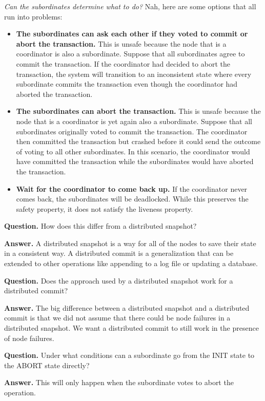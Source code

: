 \documentclass[twoside]{article}
\begin{document}
\emph{Can the subordinates determine what to do?} Nah, here are some options that all run into problems:
\begin{itemize}
    \item \textbf{The subordinates can ask each other if they voted to commit or abort the transaction.} This is unsafe because the node that is a coordinator is also a subordinate. Suppose that all subordinates agree to commit the transaction. If the coordinator had decided to abort the transaction, the system will transition to an inconsistent state where every subordinate commits the transaction even though the coordinator had aborted the transaction.
    \item \textbf{The subordinates can abort the transaction.} This is unsafe because the node that is a coordinator is yet again also a subordinate. Suppose that all subordinates originally voted to commit the transaction. The coordinator then committed the transaction but crashed before it could send the outcome of voting to all other subordinates. In this scenario, the coordinator would have committed the transaction while the subordinates would have aborted the transaction.
    \item \textbf{Wait for the coordinator to come back up.} If the coordinator never comes back, the subordinates will be deadlocked. While this preserves the safety property, it does not satisfy the liveness property. 
\end{itemize}

\textbf{Question.} How does this differ from a distributed snapshot?

\textbf{Answer.} A distributed snapshot is a way for all of the nodes to save their state in a consistent way. A distributed commit is a generalization that can be extended to other operations like appending to a log file or updating a database.

\textbf{Question.} Does the approach used by a distributed snapshot work for a distributed commit?

\textbf{Answer.} The big difference between a distributed snapshot and a distributed commit is that we did not assume that there could be node failures in a distributed snapshot. We want a distributed commit to still work in the presence of node failures.

\textbf{Question.} Under what conditions can a subordinate go from the {\ttfamily INIT} state to the {\ttfamily ABORT} state directly?

\textbf{Answer.} This will only happen when the subordinate votes to abort the operation.
\end{document}
